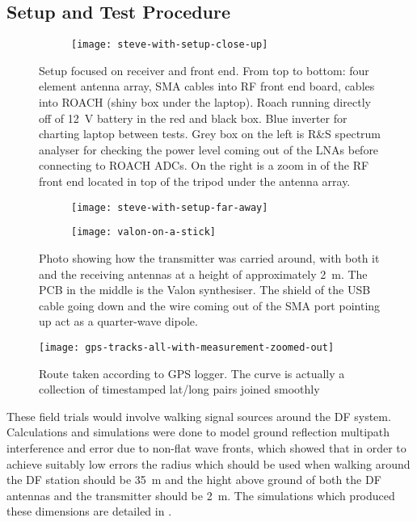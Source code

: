 \subsection{Setup and Test Procedure}

\begin{figure}
  \centering
  \begin{subfigure}{0.8\textwidth}
    \texttt{[image: steve-with-setup-close-up]}
  \end{subfigure}
  \caption{Setup focused on receiver and front end. From top to bottom: four element antenna array, SMA cables into RF front end board, cables into ROACH (shiny box under the laptop). Roach running directly off of \SI{12}{\volt} battery in the red and black box. Blue inverter for charting laptop between tests. Grey box on the left is R\&S spectrum analyser for checking the power level coming out of the LNAs before connecting to ROACH ADCs.  On the right is a zoom in of the RF front end located in top of the tripod under the antenna array.}
  \label{fig:field-trials:setup-closeup}
\end{figure}

\begin{figure}
  \centering
  \begin{subfigure}[b]{0.70\textwidth}
    \centering
    \texttt{[image: steve-with-setup-far-away]}
  \end{subfigure}
  \begin{subfigure}[b]{0.24\textwidth}
    \centering
    \texttt{[image: valon-on-a-stick]}
  \end{subfigure}
  \caption{Photo showing how the transmitter was carried around, with both it and the receiving antennas at a height of approximately \SI{2}{\meter}. The PCB in the middle is the Valon synthesiser. The shield of the USB cable going down and the wire coming out of the SMA port pointing up act as a quarter-wave dipole.}
  \label{fig:field-trials-transmitter-on-stick}
\end{figure}

\begin{figure}
  \centering
  \texttt{[image: gps-tracks-all-with-measurement-zoomed-out]}
  \caption{Route taken according to GPS logger. The curve is actually a collection of timestamped lat/long pairs joined smoothly}
  \label{fig:field-trails:gps-tracks-all}
\end{figure}

These field trials would involve walking signal sources around the DF system. Calculations and simulations were done to model ground reflection multipath interference and error due to non-flat wave fronts, which showed that in order to achieve suitably low errors the radius which should be used when walking around the DF station should be \SI{35}{\metre} and the hight above ground of both the DF antennas and the transmitter should be \SI{2}{\meter}. The simulations which produced these dimensions are detailed in .

